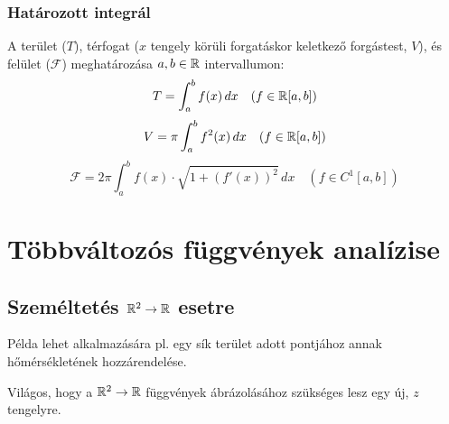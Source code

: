 \documentclass[a4paper,11.5pt]{article}
\begin{document}
	\subsubsection{Határozott integrál}
	A terület ($T$), térfogat ($x$ tengely körüli forgatáskor keletkező forgástest, $V$), és felület ($\mathcal{F}$) meghatározása $a,b\in\mathbb{R}$ intervallumon:
	\[ T=\int_a^bf(x)\,dx\quad (f\in\mathbb{R}[a,b]) \]
	\[ V=\pi\int_a^bf^2(x)\,dx\quad (f\in\mathbb{R}[a,b]) \]
	\[ \mathcal{F}=2\pi\int_a^bf(x)\cdot\sqrt{1+(f'(x))^2}\,dx\quad (f\in C^1[a,b]) \]
	\section{Többváltozós függvények analízise}
	\subsection{Személtetés $\mathbb{R}^2\to\mathbb{R}$ esetre}
	\begin{note}
		Példa lehet alkalmazására pl. egy sík terület adott pontjához annak hőmérsékletének hozzárendelése.
	\end{note}
	\begin{note}
		Világos, hogy a $\mathbb{R}^2\to\mathbb{R}$ függvények ábrázolásához szükséges lesz egy új, $z$ tengelyre.
	\end{note}
\end{document}
